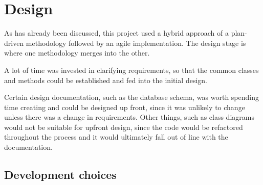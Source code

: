 \chapter{Design} %

As has already been discussed, this project used a hybrid approach of a plan-driven methodology followed by an agile implementation. The design stage is where one methodology merges into the other.

A lot of time was invested in clarifying requirements, so that the common classes and methods could be established and fed into the initial design.

Certain design documentation, such as the database schema, was worth spending time creating and could be designed up front, since it was unlikely to change unless there was a change in requirements. Other things, such as class diagrams would not be suitable for upfront design, since the code would be refactored throughout the process and it would ultimately fall out of line with the documentation.

\section{Development choices}

